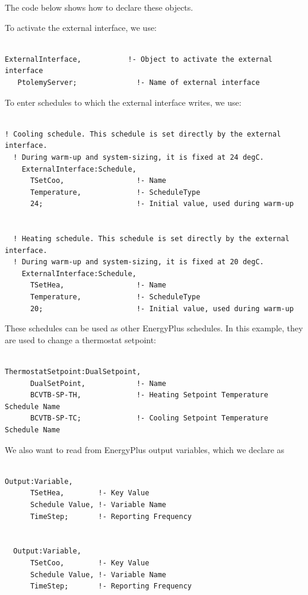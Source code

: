 The code below shows how to declare these objects.

To activate the external interface, we use:

\begin{lstlisting}

ExternalInterface,           !- Object to activate the external interface
   PtolemyServer;              !- Name of external interface
\end{lstlisting}

To enter schedules to which the external interface writes, we use:

\begin{lstlisting}

! Cooling schedule. This schedule is set directly by the external interface.
  ! During warm-up and system-sizing, it is fixed at 24 degC.
    ExternalInterface:Schedule,
      TSetCoo,                 !- Name
      Temperature,             !- ScheduleType
      24;                      !- Initial value, used during warm-up


  ! Heating schedule. This schedule is set directly by the external interface.
  ! During warm-up and system-sizing, it is fixed at 20 degC.
    ExternalInterface:Schedule,
      TSetHea,                 !- Name
      Temperature,             !- ScheduleType
      20;                      !- Initial value, used during warm-up
\end{lstlisting}

These schedules can be used as other EnergyPlus schedules. In this example, they are used to change a thermostat setpoint:

\begin{lstlisting}

ThermostatSetpoint:DualSetpoint,
      DualSetPoint,            !- Name
      BCVTB-SP-TH,             !- Heating Setpoint Temperature Schedule Name
      BCVTB-SP-TC;             !- Cooling Setpoint Temperature Schedule Name
\end{lstlisting}

We also want to read from EnergyPlus output variables, which we declare as

\begin{lstlisting}

Output:Variable,
      TSetHea,        !- Key Value
      Schedule Value, !- Variable Name
      TimeStep;       !- Reporting Frequency


  Output:Variable,
      TSetCoo,        !- Key Value
      Schedule Value, !- Variable Name
      TimeStep;       !- Reporting Frequency
\end{lstlisting}

